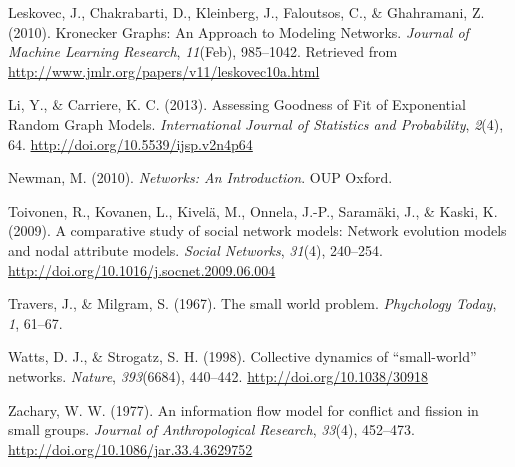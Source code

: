 \documentclass[12pt,twoside]{amherstthesis}
\begin{document}
  \hypertarget{ref-leskovec_kronecker_2010}{}
  Leskovec, J., Chakrabarti, D., Kleinberg, J., Faloutsos, C., \&
  Ghahramani, Z. (2010). Kronecker Graphs: An Approach to Modeling
  Networks. \emph{Journal of Machine Learning Research}, \emph{11}(Feb),
  985--1042. Retrieved from
  \url{http://www.jmlr.org/papers/v11/leskovec10a.html}
  
  \hypertarget{ref-li_assessing_2013}{}
  Li, Y., \& Carriere, K. C. (2013). Assessing Goodness of Fit of
  Exponential Random Graph Models. \emph{International Journal of
  Statistics and Probability}, \emph{2}(4), 64.
  \url{http://doi.org/10.5539/ijsp.v2n4p64}
  
  \hypertarget{ref-newman_networks:_2010}{}
  Newman, M. (2010). \emph{Networks: An Introduction}. OUP Oxford.
  
  \hypertarget{ref-toivonen_comparative_2009}{}
  Toivonen, R., Kovanen, L., Kivelä, M., Onnela, J.-P., Saramäki, J., \&
  Kaski, K. (2009). A comparative study of social network models: Network
  evolution models and nodal attribute models. \emph{Social Networks},
  \emph{31}(4), 240--254.
  \url{http://doi.org/10.1016/j.socnet.2009.06.004}
  
  \hypertarget{ref-travers1967small}{}
  Travers, J., \& Milgram, S. (1967). The small world problem.
  \emph{Phychology Today}, \emph{1}, 61--67.
  
  \hypertarget{ref-watts_collective_1998}{}
  Watts, D. J., \& Strogatz, S. H. (1998). Collective dynamics of
  ``small-world'' networks. \emph{Nature}, \emph{393}(6684), 440--442.
  \url{http://doi.org/10.1038/30918}
  
  \hypertarget{ref-zachskarateclub}{}
  Zachary, W. W. (1977). An information flow model for conflict and
  fission in small groups. \emph{Journal of Anthropological Research},
  \emph{33}(4), 452--473. \url{http://doi.org/10.1086/jar.33.4.3629752}


\end{document}
